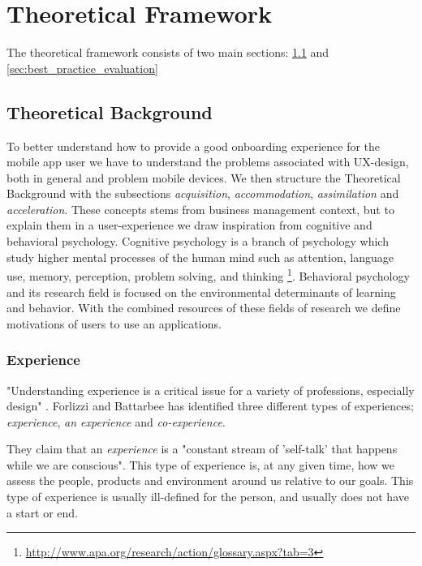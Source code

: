 \chapter{Theoretical Framework}
\label{chap:theoretical_framework}
The theoretical framework consists of two main sections: \ref{sec:theoretical_background} and \ref{sec:best_practice_evaluation}


\section{Theoretical Background}
\label{sec:theoretical_background}
To better understand how to provide a good onboarding experience for the mobile app user we have to understand the problems associated with UX-design, both in general and problem mobile devices. We then structure the Theoretical Background with the subsections \textit{acquisition}, \textit{accommodation}, \textit{assimilation} and \textit{acceleration}. These concepts stems from business management context, but to explain them in a user-experience we draw inspiration from cognitive and behavioral psychology. Cognitive psychology is a branch of psychology which study higher mental processes of the human mind such as attention, language use, memory, perception, problem solving, and thinking \footnote{\url{http://www.apa.org/research/action/glossary.aspx?tab=3}}. Behavioral psychology and its research field is focused on the environmental determinants of learning and behavior. With the combined resources of these fields of research we define motivations of users to use an applications.

\subsection{Experience}
"Understanding experience is a critical issue for a variety of professions, especially design" \cite{Forlizzi2004}. Forlizzi and Battarbee has identified three different types of experiences; \textit{experience}, \textit{an experience} and \textit{co-experience}.

They claim that an \textit{experience} is a "constant stream of 'self-talk' that happens while we are conscious". This type of experience is, at any given time, how we assess the people, products and environment around us relative to our goals. This type of experience is usually ill-defined for the person, and usually does not have a start or end.

